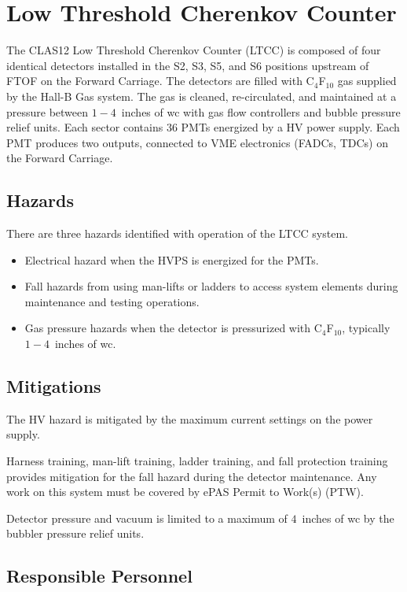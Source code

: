 \section{Low Threshold Cherenkov Counter}

The CLAS12 Low Threshold Cherenkov Counter (LTCC) is composed of four identical detectors
installed in the S2, S3, S5, and S6 positions upstream of FTOF on the Forward Carriage. 
The detectors are filled with C$_4$F$_{10}$ gas supplied by the Hall-B Gas system. The gas 
is cleaned, re-circulated, and maintained at a pressure between $1 - 4$~inches of wc with 
gas flow controllers and bubble pressure relief units. Each sector contains 36 PMTs energized 
by a HV power supply. Each PMT produces two outputs, connected to VME electronics (FADCs, 
TDCs) on the Forward Carriage.

\subsection{Hazards} 

There are three hazards identified with operation of the LTCC system. 
\begin{itemize}
\item Electrical hazard when the HVPS is energized for the PMTs.
\item Fall hazards from using man-lifts or ladders to access system elements during 
maintenance and testing operations. 
\item Gas pressure hazards when the detector is pressurized with C$_4$F$_{10}$, typically 
$1 -4$~inches of wc.
\end{itemize}

\subsection{Mitigations}

The HV hazard is mitigated by the maximum current settings on the power supply.

Harness training, man-lift training, ladder training, and fall protection training provides 
mitigation for the fall hazard during the detector maintenance.  Any work on this system must
be covered by ePAS Permit to Work(s) (PTW).

Detector pressure and vacuum is limited to a maximum of $4$~inches of wc by the bubbler 
pressure relief units.

\subsection{Responsible Personnel}

